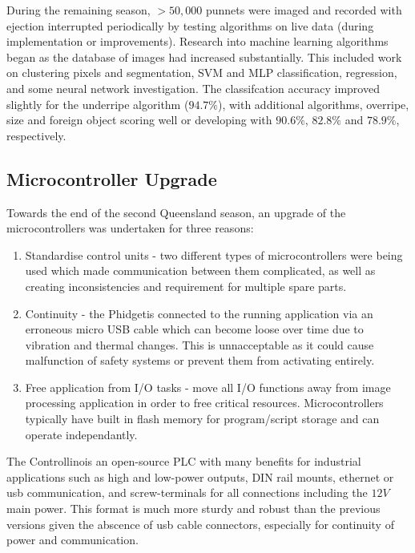\documentclass[fleqn,twoside]{article}
\begin{document}
During the remaining season, $>50,000$ punnets were imaged and recorded with ejection interrupted periodically by testing algorithms on live data (during implementation or improvements). Research into machine learning algorithms began as the database of images had increased substantially. This included work on clustering pixels and segmentation, SVM and MLP classification, regression, and some neural network investigation. The classifcation accuracy improved slightly for the underripe algorithm ($94.7\%$), with additional algorithms, overripe, size and foreign object scoring well or developing with $90.6\%$, $82.8\%$ and $78.9\%$, respectively.


\subsection{Microcontroller Upgrade}


Towards the end of the second Queensland season, an upgrade of the microcontrollers was undertaken for three reasons:

\begin{enumerate}
	\item Standardise control units - two different types of microcontrollers were being used which made communication between them complicated, as well as creating inconsistencies and requirement for multiple spare parts.
	\item Continuity - the Phidget\texttrademark is connected to the running application via an erroneous micro USB cable which can become loose over time due to vibration and thermal changes. This is unnacceptable as it could cause malfunction of safety systems or prevent them from activating entirely. 
	\item Free application from I/O tasks - move all I/O functions away from image processing application in order to free critical resources. Microcontrollers typically have built in flash memory for program/script storage and can operate independantly.
\end{enumerate}

The Controllino\texttrademark is an open-source PLC with many benefits for industrial applications such as high and low-power outputs, DIN rail mounts, ethernet or usb communication, and screw-terminals for all connections including the $12V$ main power. This format is much more sturdy and robust than the previous versions given the abscence of usb cable connectors, especially for continuity of power and communication.
\end{document}

